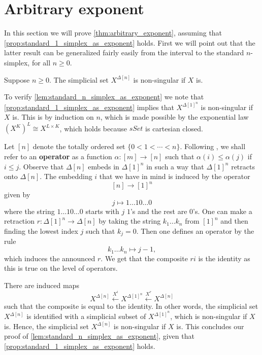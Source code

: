 

\section{Arbitrary exponent}
\label{sec:arbexp}

In this section we will prove \cref{thm:arbitrary_exponent}, assuming that \cref{prop:standard_1_simplex_as_exponent} holds. First we will point out that the latter result can be generalized fairly easily from the interval to the standard $n$-simplex, for all $n\geq 0$.
\begin{lemma}\label{lem:standard_n_simplex_as_exponent}
Suppose $n\geq 0$. The simplicial set $X^{\Delta [n]}$ is non-singular if $X$ is.
\end{lemma}
\noindent To verify \cref{lem:standard_n_simplex_as_exponent} we note that \cref{prop:standard_1_simplex_as_exponent} implies that $X^{\Delta [1]^n}$ is non-singular if $X$ is. This is by induction on $n$, which is made possible by the exponential law $(X^K)^L\cong X^{L\times K}$, which holds because $sSet$ is cartesian closed.

Let $[n]$ denote the totally ordered set $\{ 0<1<\cdots <n\}$. Following \cite[p.~132]{FP90}, we shall refer to an \textbf{operator} as a function $\alpha :[m]\to [n]$ such that $\alpha (i)\leq \alpha (j)$ if $i\leq j$. Observe that $\Delta [n]$ embeds in $\Delta [1]^n$ in such a way that $\Delta [1]^n$ retracts onto $\Delta [n]$. The embedding $i$ that we have in mind is induced by the operator
\[[n]\to [1]^n\]
given by
\[j\mapsto 1\dots 10\dots 0\]
where the string $1\dots 10\dots 0$ starts with $j$ $1$'s and the rest are $0$'s. One can make a retraction $r:\Delta [1]^n\to \Delta [n]$ by taking the string $k_1\dots k_n$ from $[1]^n$ and then finding the lowest index $j$ such that $k_j=0$. Then one defines an operator by the rule
\[k_1\dots k_n\mapsto j-1,\]
which induces the announced $r$. We get that the composite $ri$ is the identity as this is true on the level of operators.

There are induced maps
\[X^{\Delta [n]}\xleftarrow{X^i} X^{\Delta [1]^n}\xleftarrow{X^r} X^{\Delta [n]}\]
such that the composite is equal to the identity. In other words, the simplicial set $X^{\Delta [n]}$ is identified with a simplicial subset of $X^{\Delta [1]^n}$, which is non-singular if $X$ is. Hence, the simplicial set $X^{\Delta [n]}$ is non-singular if $X$ is. This concludes our proof of \cref{lem:standard_n_simplex_as_exponent}, given that \cref{prop:standard_1_simplex_as_exponent} holds.

